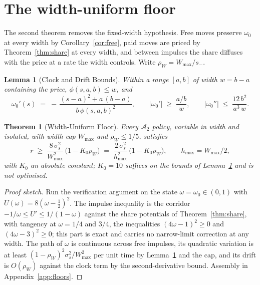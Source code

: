 \documentclass[11pt,a4paper]{article}
\theoremstyle{definition}
\theoremstyle{plain}
\newtheorem{theorem}{Theorem}
\newtheorem{lemma}{Lemma}
\theoremstyle{remark}
\begin{document}
\section{The width-uniform floor}\label{sec:width}

The second theorem removes the fixed-width hypothesis. Free moves preserve $\omega_0$ at every width by Corollary~\ref{cor:free}, paid moves are priced by Theorem~\ref{thm:share} at every width, and
between impulses the share diffuses with the price at a rate the width controls. Write $\rho_W = W_{\max}/s_-$.

\begin{lemma}[Clock and Drift Bounds]\label{lem:clock}
Within a range $[a, b]$ of width $w = b - a$ containing the price,
$\phi(s, a, b) \le w$, and
\begin{equation}\label{eq:clock}
\omega_0'(s) \;=\; -\,\frac{(s - a)^2 + a\,(b - a)}{b\,\phi(s, a,
b)^2}, \qquad |\omega_0'| \;\ge\; \frac{a/b}{w}, \qquad
|\omega_0''| \;\le\; \frac{12\, b^2}{a^3\, w}.
\end{equation}
\end{lemma}

\begin{theorem}[Width-Uniform Floor]\label{thm:width}
Every $\mathcal{A}_2$ policy, variable in width and isolated, with width cap $W_{\max}$ and $\rho_W \le 1/5$, satisfies
\begin{equation}\label{eq:widthfloor}
r \;\ge\; \frac{8\,\sigma_s^2}{W_{\max}^2}\,\big(1 - K_0
\rho_W\big) \;=\; \frac{2\,\sigma_s^2}{h_{\max}^2}\,\big(1 - K_0
\rho_W\big), \qquad h_{\max} = W_{\max}/2,
\end{equation}
with $K_0$ an absolute constant; $K_0 = 10$ suffices on the bounds of Lemma~\ref{lem:clock} and is not optimised.
\end{theorem}

\begin{proof}[Proof sketch]
Run the verification argument on the state $\omega = \omega_0 \in(0, 1)$ with $U(\omega) = 8(\omega - \tfrac12)^2$. The impulse inequality is the corridor $-1/\omega \le U' \le 1/(1-\omega)$
against the share potentials of Theorem~\ref{thm:share}, with tangency at $\omega = 1/4$ and $3/4$, the inequalities $(4\omega - 1)^2 \ge 0$ and $(4\omega - 3)^2 \ge 0$; this part is exact and
carries no narrow-limit correction at any width. The path of $\omega$ is continuous across free impulses, its quadratic variation is at least $(1 - \rho_W)^2 \sigma_s^2 / W_{\max}^2$ per unit
time by Lemma~\ref{lem:clock} and the cap, and its drift is $O(\rho_W)$ against the clock term by the second-derivative bound. Assembly in Appendix~\ref{app:floors}.
\end{proof}
\end{document}
